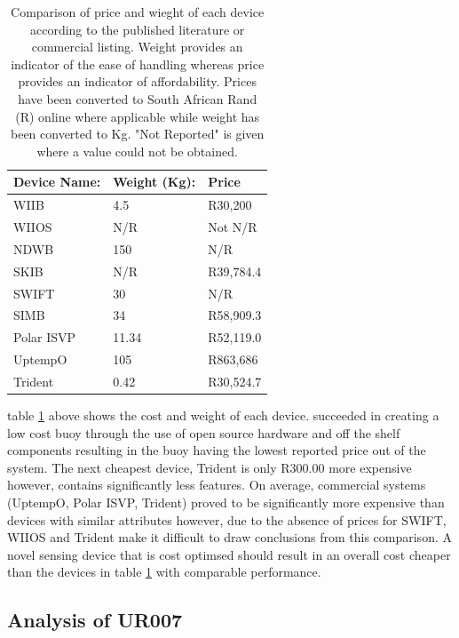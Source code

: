 \begin{table}[H]
	\centering

	\caption{Comparison of price and wieght of each device according to the published literature or commercial listing. Weight provides an indicator of the ease of handling whereas price provides an indicator of affordability. Prices have been converted to South African Rand (R)  online \cite{usdcoversion}where applicable while weight has been converted to Kg. "Not Reported" is given where a value could not be obtained. }
	
	\begin{tabular}{|l|l|l|}
		\hline
		\textbf{Device Name:} & \textbf{Weight (Kg):} & \textbf{Price} \\
		\hline
		WIIB & 4.5 & R30,200\\
		\hline
		WIIOS & N/R & Not N/R \\
		\hline
		NDWB & 150 & N/R \\
		\hline
		SKIB  & N/R &  R39,784.4\\
		\hline
		SWIFT & 30 & N/R \\
		\hline
		SIMB & 34 & R58,909.3 \\
		\hline
		Polar ISVP & 11.34 & R52,119.0 \\
		\hline
		UptempO & 105 & R863,686 \\
		\hline
		Trident & 0.42 & R30,524.7 \\
		\hline
	\end{tabular}
	\label{tab:device_price}
\end{table}
 
table \ref{tab:device_price} above shows the cost and weight of each device. \textcite{rabault2019open} succeeded in creating a low cost buoy through the use of open source hardware and off the shelf components resulting in the buoy having the lowest reported price out of the system. The next cheapest device, Trident is only R300.00 more expensive however, contains significantly less features. On average, commercial systems (UptempO, Polar ISVP, Trident) proved to be significantly more expensive than devices with similar attributes however, due to the absence of prices for SWIFT, WIIOS and Trident make it difficult to draw conclusions from this comparison. A novel sensing device that is cost optimsed should result in an overall cost cheaper than the devices in table \ref{tab:device_price} with comparable performance.

\subsection{Analysis of UR007}

